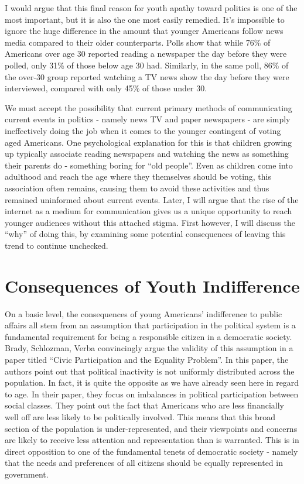 \documentclass[12pt,letterpaper]{article}
\begin{document}
I would argue that this final reason for youth apathy toward politics
is one of the most important, but it is also the one most easily
remedied.  It's impossible to ignore the huge difference in the amount
that younger Americans follow news media compared to their older
counterparts.  Polls show that while 76\% of Americans over age 30
reported reading a newspaper the day before they were polled, only
31\% of those below age 30 had. Similarly, in the same poll, 86\% of
the over-30 group reported watching a TV news show the day before they
were interviewed, compared with only 45\% of those under 30.  

We must accept the possibility that current primary methods of
communicating current events in politics - namely news TV and paper
newspapers - are simply ineffectively doing the job when it comes to
the younger contingent of voting aged Americans.  One psychological
explanation for this is that children growing up typically associate
reading newspapers and watching the news as something their parents do
- something boring for ``old people''.  Even as children come into
adulthood and reach the age where they themselves should be voting,
this association often remains, causing them to avoid these activities
and thus remained uninformed about current events. Later, I will argue
that the rise of the internet as a medium for communication gives us a
unique opportunity to reach younger audiences without this attached
stigma.  First however, I will discuss the ``why'' of doing this, by
examining some potential consequences of leaving this trend to
continue unchecked.

\section{Consequences of Youth Indifference} %
\label{sec:Consequences of Youth Indifference}
On a basic level, the consequences of young Americans' indifference to
public affairs all stem from an assumption that participation in the
political system is a fundamental requirement for being a responsible
citizen in a democratic society.  Brady, Schlozman, Verba convincingly argue the
validity of this assumption in a paper titled ``Civic Participation
and the Equality Problem''.  In this paper, the authors point out that
political inactivity is not uniformly distributed across the
population.  In fact, it is quite the opposite as we have already seen
here in regard to age.  In their paper, they focus on imbalances in political
participation between social classes. They point out the fact that
Americans who are less financially well off are less likely to be
politically involved.  This means that this broad section of the
population is under-represented, and their viewpoints and concerns are
likely to receive less attention and representation than is warranted.
This is in direct opposition to one of the fundamental tenets of
democratic society - namely that the needs and preferences of all
citizens should be equally represented in government.
\end{document}
